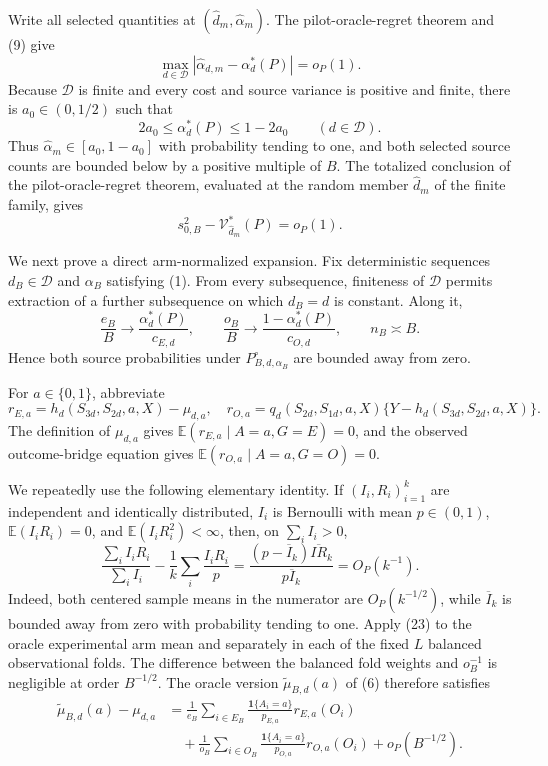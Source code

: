 Write all selected quantities at \((\widehat d_m,\widehat\alpha_m)\).  The pilot-oracle-regret theorem and (9) give
\[
\max_{d\in\mathcal D}|\widehat\alpha_{d,m}-\alpha_d^*(P)|=o_P(1).\tag{18}
\]
Because \(\mathcal D\) is finite and every cost and source variance is positive and finite, there is \(a_0\in(0,1/2)\) such that
\[
2a_0\le\alpha_d^*(P)\le1-2a_0\qquad(d\in\mathcal D).             \tag{19}
\]
Thus \(\widehat\alpha_m\in[a_0,1-a_0]\) with probability tending to one, and both selected source counts are bounded below by a positive multiple of \(B\).  The totalized conclusion of the pilot-oracle-regret theorem, evaluated at the random member \(\widehat d_m\) of the finite family, gives
\[
s_{0,B}^2-\mathcal V_{\widehat d_m}^*(P)=o_P(1).                   \tag{20}
\]

We next prove a direct arm-normalized expansion.  Fix deterministic sequences \(d_B\in\mathcal D\) and \(\alpha_B\) satisfying (1).  From every subsequence, finiteness of \(\mathcal D\) permits extraction of a further subsequence on which \(d_B=d\) is constant.  Along it,
\[
\frac{e_B}{B}\to\frac{\alpha_d^*(P)}{c_{E,d}},\qquad
\frac{o_B}{B}\to\frac{1-\alpha_d^*(P)}{c_{O,d}},\qquad n_B\asymp B.\tag{21}
\]
Hence both source probabilities under \(P_{B,d,\alpha_B}^{\circ}\) are bounded away from zero.

For \(a\in\{0,1\}\), abbreviate
\[
r_{E,a}=h_d(S_{3d},S_{2d},a,X)-\mu_{d,a},
\quad
r_{O,a}=q_d(S_{2d},S_{1d},a,X)
\{Y-h_d(S_{3d},S_{2d},a,X)\}.                                    \tag{22}
\]
The definition of \(\mu_{d,a}\) gives \(\mathbb E(r_{E,a}\mid A=a,G=E)=0\), and the observed outcome-bridge equation gives \(\mathbb E(r_{O,a}\mid A=a,G=O)=0\).

We repeatedly use the following elementary identity.  If \((I_i,R_i)_{i=1}^k\) are independent and identically distributed, \(I_i\) is Bernoulli with mean \(p\in(0,1)\), \(\mathbb E(I_iR_i)=0\), and \(\mathbb E(I_iR_i^2)<\infty\), then, on \(\sum_iI_i>0\),
\[
\frac{\sum_iI_iR_i}{\sum_iI_i}
-\frac1k\sum_i\frac{I_iR_i}{p}
=\frac{(p-\overline I_k)\overline{IR}_k}{p\overline I_k}
=O_P(k^{-1}).                                                       \tag{23}
\]
Indeed, both centered sample means in the numerator are \(O_P(k^{-1/2})\), while \(\overline I_k\) is bounded away from zero with probability tending to one.  Apply (23) to the oracle experimental arm mean and separately in each of the fixed \(L\) balanced observational folds.  The difference between the balanced fold weights and \(o_B^{-1}\) is negligible at order \(B^{-1/2}\).  The oracle version \(\widetilde\mu_{B,d}(a)\) of (6) therefore satisfies
\[
\begin{aligned}
\widetilde\mu_{B,d}(a)-\mu_{d,a}
&=\frac1{e_B}\sum_{i\in E_B}
\frac{\mathbf1\{A_i=a\}}{p_{E,a}}r_{E,a}(O_i)\\
&\quad+\frac1{o_B}\sum_{i\in O_B}
\frac{\mathbf1\{A_i=a\}}{p_{O,a}}r_{O,a}(O_i)
+o_P(B^{-1/2}).
\end{aligned}                                                       \tag{24}
\]

